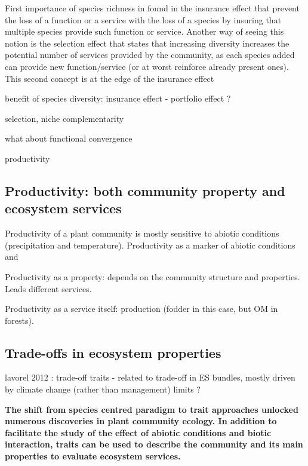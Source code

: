 First importance of species richness in found in the insurance effect that prevent the loss of a function or a service with the loss of a species by insuring that multiple species provide such function or service. Another way of seeing this notion is the selection effect that states that increasing diversity increases the potential number of services provided by the community, as each species added can provide new function/service (or at worst reinforce already present ones). This second concept is at the edge of the insurance effect

benefit of species diversity: insurance effect - portfolio effect ?

selection, niche complementarity

what about functional convergence

productivity 

\textbf{}

\subsection{Productivity: both community property and ecosystem services}

Productivity of a plant community is mostly sensitive to abiotic conditions (precipitation and temperature). 
Productivity as a marker of abiotic conditions and 

Productivity as a property: depends on the community structure and properties. Leads different services.

Productivity as a service itself: production (fodder in this case, but OM in forests).

\textbf{}

\subsection{Trade-offs in ecosystem properties}

lavorel 2012 : trade-off  \parencite{lavorel_how_2012}
traits - related to trade-off in ES bundles, mostly driven by climate change (rather than management) \parencite{lamarque_plant_2014} limits ?
\textbf{}


\textbf{The shift from species centred paradigm to trait approaches unlocked numerous discoveries in plant community ecology. In addition to facilitate the study of the effect of abiotic conditions and biotic interaction, traits can be used to describe the community and its main properties to evaluate ecosystem services.}

